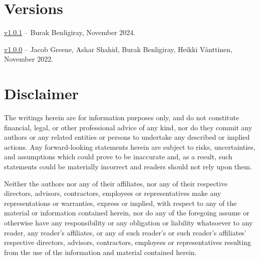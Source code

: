 \documentclass[11pt]{article}
\begin{document}
\small



\normalsize
\appendix
\section{Versions}
\label{sec:versions}
\href{https://github.com/api3dao/oev-litepaper/releases/tag/v1.0.1}{v1.0.1} -- Burak Benligiray, November 2024.

\href{https://github.com/api3dao/oev-litepaper/releases/tag/v1.0.0}{v1.0.0} -- Jacob Greene, Ashar Shahid, Burak Benligiray, Heikki Vänttinen, November 2022.

\section{Disclaimer}
\label{sec:disclaimer}

The writings herein are for information purposes only, and do not constitute financial, legal, or other professional advice of any kind, nor do they commit any authors or any related entities or persons to undertake any described or implied actions.
Any forward-looking statements herein are subject to risks, uncertainties, and assumptions which could prove to be inaccurate and, as a result, such statements could be materially incorrect and readers should not rely upon them.

Neither the authors nor any of their affiliates, nor any of their respective directors, advisors, contractors, employees or representatives make any representations or warranties, express or implied, with respect to any of the material or information contained herein, nor do any of the foregoing assume or otherwise have any responsibility or any obligation or liability whatsoever to any reader, any reader's affiliates, or any of such reader's or such reader's affiliates' respective directors, advisors, contractors, employees or representatives resulting from the use of the information and material contained herein.
\end{document}
